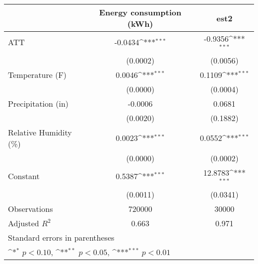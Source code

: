 {
\def\sym#1{\ifmmode^{#1}\else\(^{#1}\)\fi}
\begin{tabular}{l*{2}{c}}
\hline\hline
                    &\multicolumn{1}{c}{Energy consumption (kWh)}&\multicolumn{1}{c}{est2}\\
\hline
ATT                 &     -0.0434\sym{***}&     -0.9356\sym{***}\\
                    &    (0.0002)         &    (0.0056)         \\
[1em]
Temperature (F)     &      0.0046\sym{***}&      0.1109\sym{***}\\
                    &    (0.0000)         &    (0.0004)         \\
[1em]
Precipitation (in)  &     -0.0006         &      0.0681         \\
                    &    (0.0020)         &    (0.1882)         \\
[1em]
Relative Humidity (\%)&      0.0023\sym{***}&      0.0552\sym{***}\\
                    &    (0.0000)         &    (0.0002)         \\
[1em]
Constant            &      0.5387\sym{***}&     12.8783\sym{***}\\
                    &    (0.0011)         &    (0.0341)         \\
\hline
Observations        &      720000         &       30000         \\
Adjusted \(R^{2}\)  &       0.663         &       0.971         \\
\hline\hline
\multicolumn{3}{l}{\footnotesize Standard errors in parentheses}\\
\multicolumn{3}{l}{\footnotesize \sym{*} \(p<0.10\), \sym{**} \(p<0.05\), \sym{***} \(p<0.01\)}\\
\end{tabular}
}
